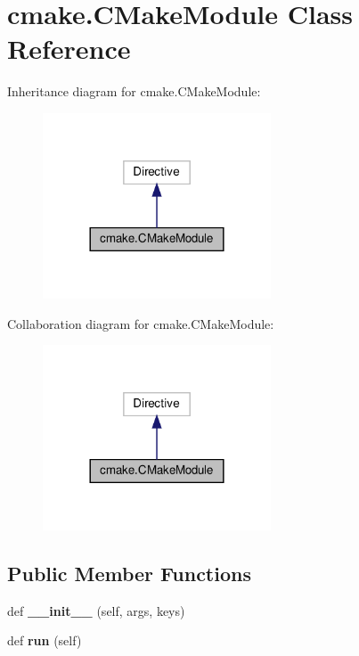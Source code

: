 \hypertarget{classcmake_1_1CMakeModule}{}\section{cmake.\+C\+Make\+Module Class Reference}
\label{classcmake_1_1CMakeModule}


Inheritance diagram for cmake.\+C\+Make\+Module\+:
\nopagebreak
\begin{figure}[H]
\begin{center}
\leavevmode
\includegraphics[width=192pt]{classcmake_1_1CMakeModule__inherit__graph}
\end{center}
\end{figure}


Collaboration diagram for cmake.\+C\+Make\+Module\+:
\nopagebreak
\begin{figure}[H]
\begin{center}
\leavevmode
\includegraphics[width=192pt]{classcmake_1_1CMakeModule__coll__graph}
\end{center}
\end{figure}
\subsection*{Public Member Functions}
\begin{DoxyCompactItemize}
\item 
\mbox{\label{classcmake_1_1CMakeModule_a42d2e41b69c92d05ff380fa12a5ff9c5}} 
def {\bfseries \+\_\+\+\_\+init\+\_\+\+\_\+} (self, args, keys)
\item 
\mbox{\label{classcmake_1_1CMakeModule_a08741d315b312c41742816b16b8bfcef}} 
def {\bfseries run} (self)
\end{DoxyCompactItemize}
